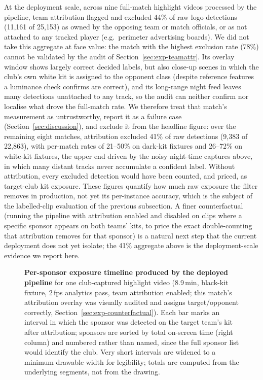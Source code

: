 \documentclass[conference,a4paper]{IEEEtran}
\begin{document}
\label{sec:exp-counterfactual}
At the deployment scale, across nine full-match highlight videos processed by the
pipeline, team
attribution flagged and excluded 44\% of raw logo detections (11{,}161 of 25{,}153)
as owned by the opposing team or match officials, or as not attached to any tracked
player (e.g.\ perimeter advertising boards). We did not take this aggregate at face
value: the match with the highest exclusion rate (78\%) cannot be validated by the
audit of Section~\ref{sec:exp-teamattr}. Its overlay window shows largely correct decided
labels, but also close-up scenes in which the club's own white kit is assigned to
the opponent class (despite reference features a luminance check confirms are
correct), and its long-range night feed leaves many detections unattached to any
track, so the audit can neither confirm nor localise what drove the full-match
rate. We therefore treat that match's measurement as untrustworthy, report it as a
failure case (Section~\ref{sec:discussion}), and exclude it from the headline figure: over the remaining eight
matches, attribution excluded 41\% of raw detections (9{,}383 of 22{,}863), with
per-match rates of 21--50\% on dark-kit fixtures and 26--72\% on white-kit fixtures,
the upper end driven by the noisy night-time captures above, in which many distant
tracks never accumulate a confident label. Without attribution, every excluded detection would have been counted,
and priced, as target-club kit exposure. These figures quantify how much raw
exposure the filter removes in production, not yet its per-instance accuracy, which
is the subject of the labelled-clip evaluation of the previous subsection. A finer
counterfactual (running the pipeline with attribution enabled and disabled on clips
where a specific sponsor appears on both teams' kits, to price the exact
double-counting that attribution removes for that sponsor) is a natural next step
that the current deployment does not yet isolate; the 41\% aggregate above is the
deployment-scale evidence we report here.

\begin{figure}[t]
\centering
\resizebox{\textwidth}{!}{}
\caption{\textbf{Per-sponsor exposure timeline produced by the deployed pipeline}
for one club-captured highlight video (8.9\,min, black-kit fixture, 2\,fps analytics
pass, team attribution enabled; this match's attribution overlay was visually audited
and assigns target/opponent correctly, Section~\ref{sec:exp-counterfactual}). Each bar marks
an interval in which the sponsor was
detected on the target team's kit after attribution; sponsors are sorted by total
on-screen time (right column) and numbered rather than named, since the full sponsor
list would identify the club. Very short intervals are widened to a minimum drawable
width for legibility; totals are computed from the underlying segments, not from the
drawing.}
\label{fig:timeline}
\end{figure}
\end{document}
